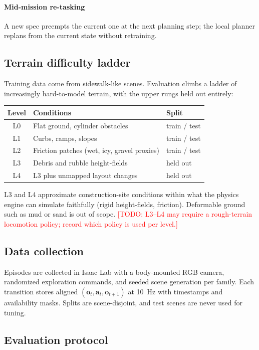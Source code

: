 \documentclass[conference]{IEEEtran}
\newcommand{\todo}[1]{\textcolor{red}{[TODO: #1]}}
\newcommand{\vect}[1]{\mathbf{#1}}
\begin{document}
\paragraph{Mid-mission re-tasking}
A new spec preempts the current one at the next planning step; the
local planner replans from the current state without retraining.

\subsection{Terrain difficulty ladder}
Training data come from sidewalk-like scenes. Evaluation climbs a ladder
of increasingly hard-to-model terrain, with the upper rungs held out
entirely:
\begin{center}
\begin{tabular}{@{}cll@{}}
\toprule
Level & Conditions & Split \\
\midrule
L0 & Flat ground, cylinder obstacles & train / test \\
L1 & Curbs, ramps, slopes & train / test \\
L2 & Friction patches (wet, icy, gravel proxies) & train / test \\
L3 & Debris and rubble height-fields & held out \\
L4 & L3 plus unmapped layout changes & held out \\
\bottomrule
\end{tabular}
\end{center}
L3 and L4 approximate construction-site conditions within what the
physics engine can simulate faithfully (rigid height-fields, friction).
Deformable ground such as mud or sand is out of scope. \todo{L3--L4 may
require a rough-terrain locomotion policy; record which policy is used
per level.}

\subsection{Data collection}
Episodes are collected in Isaac Lab with a body-mounted RGB camera,
randomized exploration commands, and seeded scene generation per
family. Each transition stores aligned $(\vect{o}_t, \vect{a}_t,
\vect{o}_{t+1})$ at 10~Hz with timestamps and availability masks.
Splits are scene-disjoint, and test scenes are never used for tuning.

\subsection{Evaluation protocol}
\end{document}
